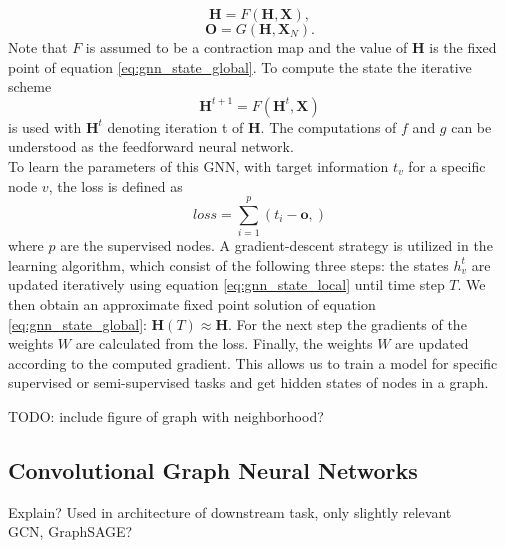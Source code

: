 \begin{equation}
    \mathbf{H} = F(\mathbf{H}, \mathbf{X}),
    \label{eq:gnn_state_global}
\end{equation}
\begin{equation}
    \mathbf{O} = G(\mathbf{H},\mathbf{X}_N).
\end{equation}
Note that $F$ is assumed to be a contraction map and the value of $\mathbf{H}$ is the fixed point of equation \eqref{eq:gnn_state_global}. To compute the state the iterative scheme
\begin{equation}
    \mathbf{H}^{t+1} = F(\mathbf{H}^t, \mathbf{X})
\end{equation}
is used with $\mathbf{H}^t$ denoting iteration t of $\mathbf{H}$. The computations of $f$ and $g$ can be understood as the feedforward neural network. \\
To learn the parameters of this GNN, with target information $t_v$ for a specific node $v$, the loss is defined as
\begin{equation}
    loss = \sum_{i=1}^p (t_i-\mathbf{o},)
\end{equation}
where $p$ are the supervised nodes. A gradient-descent strategy is utilized in the learning algorithm, which consist of the following three steps: the states $h_v^t$ are updated iteratively using equation \eqref{eq:gnn_state_local} until time step $T$. We then obtain an approximate fixed point solution of equation \eqref{eq:gnn_state_global}: $\mathbf{H}(T)\approx\mathbf{H}$. For the next step the gradients of the weights $W$ are calculated from the loss. Finally, the weights $W$ are updated according to the computed gradient. This allows us to train a model for specific supervised or semi-supervised tasks and get hidden states of nodes in a graph. \bigskip

TODO: include figure of graph with neighborhood?
\subsection{Convolutional Graph Neural Networks}
Explain? Used in architecture of downstream task, only slightly relevant \\
GCN, GraphSAGE?

